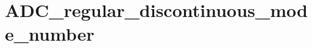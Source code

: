 \hypertarget{group___a_d_c__regular__discontinuous__mode__number}{\section{A\-D\-C\-\_\-regular\-\_\-discontinuous\-\_\-mode\-\_\-number}
\label{group___a_d_c__regular__discontinuous__mode__number}
}
